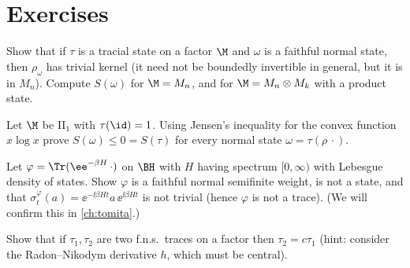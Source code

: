 \section*{Exercises}
\begin{exercise}
Show that if $\tau$ is a tracial state on a factor $\M$ and $\omega$ is a faithful normal state, then $\rho_\omega$ has trivial kernel (it need not be boundedly invertible in general, but it is in $M_n$). Compute $S(\omega)$ for $\M=M_n$, and for $\M=M_n\otimes M_k$ with a product state.
\end{exercise}
\begin{exercise}
Let $\M$ be II$_1$ with $\tau(\id)=1$. Using Jensen's inequality for the convex function $x\log x$ prove $S(\omega)\le0=S(\tau)$ for every normal state $\omega=\tau(\rho\,\cdot)$.
\end{exercise}
\begin{exercise}
Let $\varphi=\Tr(\ee^{-\beta H}\,\cdot)$ on $\BH$ with $H$ having spectrum $[0,\infty)$ with Lebesgue density of states. Show $\varphi$ is a faithful normal semifinite weight, is not a state, and that $\sigma^\varphi_t(a)=\ee^{-\ii\beta Ht}a\,\ee^{\ii\beta Ht}$ is not trivial (hence $\varphi$ is not a trace). (We will confirm this in \cref{ch:tomita}.)
\end{exercise}
\begin{exercise}
Show that if $\tau_1,\tau_2$ are two f.n.s.\ traces on a factor then $\tau_2=c\tau_1$ (hint: consider the Radon--Nikodym derivative $h$, which must be central).
\end{exercise}
